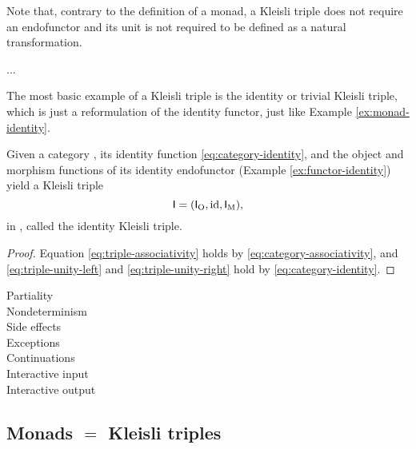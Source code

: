 \begin{remark*}
  \label{re:monad-triple}

  Note that, contrary to the definition of a monad, a Kleisli triple does not
  require an endofunctor and its unit is not required to be defined as
  a natural transformation.
\end{remark*}

...

\begin{example}
  \label{ex:triple-identity}

  The most basic example of a Kleisli triple is the identity or
  trivial Kleisli triple, which is just a reformulation of the
  identity functor, just like Example \ref{ex:monad-identity}.

  Given a category , its identity function
  \eqref{eq:category-identity}, and the object and morphism functions
  of its identity endofunctor (Example \ref{ex:functor-identity})
  yield a Kleisli triple
  \begin{equation*}
    \mathsf{I} = (\mathsf{I}_{\operatorname{O}}, \operatorname{id}, \mathsf{I}_{\operatorname{M}})
    \text{,}
  \end{equation*}
  in , called the identity Kleisli triple.
  \begin{proof}
    Equation \eqref{eq:triple-associativity} holds by
    \eqref{eq:category-associativity}, and \eqref{eq:triple-unity-left}
    and \eqref{eq:triple-unity-right} hold by
    \eqref{eq:category-identity}.
  \end{proof}
\end{example}

\begin{examples}
  \label{ex:triple-notions-computation}

  \hfill
  \begin{description}
  \item[Partiality]
  \item[Nondeterminism]
  \item[Side effects]
  \item[Exceptions]
  \item[Continuations]
  \item[Interactive input]
  \item[Interactive output]
  \end{description}
\end{examples}

\subsection*{Monads $=$ Kleisli triples}

